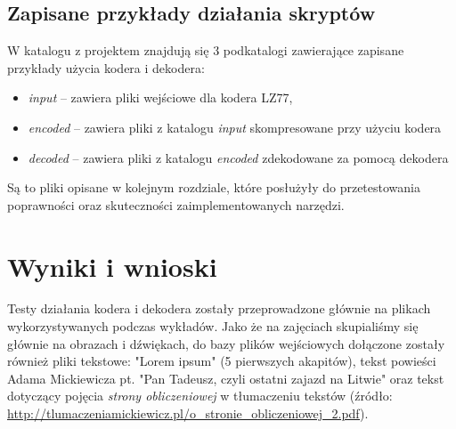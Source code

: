 \documentclass{article}
\begin{document}
\subsection{Zapisane przykłady działania skryptów}
W katalogu z projektem znajdują się 3 podkatalogi zawierające zapisane przykłady użycia kodera i dekodera:
\begin{itemize}
    \item \textit{input} -- zawiera pliki wejściowe dla kodera LZ77,
    \item \textit{encoded} -- zawiera pliki z katalogu \textit{input} skompresowane przy użyciu kodera
    \item \textit{decoded} -- zawiera pliki z katalogu \textit{encoded} zdekodowane za pomocą dekodera
\end{itemize}
Są to pliki opisane w kolejnym rozdziale, które posłużyły do przetestowania poprawności oraz skuteczności zaimplementowanych narzędzi.

\section{Wyniki i wnioski}
Testy działania kodera i dekodera zostały przeprowadzone głównie na plikach wykorzystywanych podczas wykładów. Jako że na zajęciach skupialiśmy się głównie na obrazach i dźwiękach, do bazy plików wejściowych dołączone zostały również pliki tekstowe: "Lorem ipsum" (5 pierwszych akapitów), tekst powieści Adama Mickiewicza pt. "Pan Tadeusz, czyli ostatni zajazd na Litwie" oraz tekst dotyczący pojęcia \textit{strony obliczeniowej} w tłumaczeniu tekstów (źródło: \url{http://tlumaczeniamickiewicz.pl/o_stronie_obliczeniowej_2.pdf}).
\end{document}
